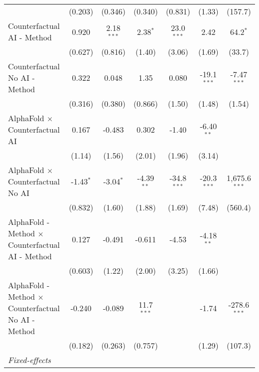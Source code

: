 \begin{tabular}{lcccccc}
                                                              & (0.203)      & (0.346)       & (0.340)      & (0.831)       & (1.33)        & (157.7)\\   
   Counterfactual AI - Method                                 & 0.920        & 2.18$^{***}$  & 2.38$^{*}$   & 23.0$^{***}$  & 2.42          & 64.2$^{*}$\\   
                                                              & (0.627)      & (0.816)       & (1.40)       & (3.06)        & (1.69)        & (33.7)\\   
   Counterfactual No AI - Method                              & 0.322        & 0.048         & 1.35         & 0.080         & -19.1$^{***}$ & -7.47$^{***}$\\   
                                                              & (0.316)      & (0.380)       & (0.866)      & (1.50)        & (1.48)        & (1.54)\\   
   AlphaFold $\times$ Counterfactual AI                       & 0.167        & -0.483        & 0.302        & -1.40         & -6.40$^{**}$  &   \\   
                                                              & (1.14)       & (1.56)        & (2.01)       & (1.96)        & (3.14)        &   \\   
   AlphaFold $\times$ Counterfactual No AI                    & -1.43$^{*}$  & -3.04$^{*}$   & -4.39$^{**}$ & -34.8$^{***}$ & -20.3$^{***}$ & 1,675.6$^{***}$\\   
                                                              & (0.832)      & (1.60)        & (1.88)       & (1.69)        & (7.48)        & (560.4)\\   
   AlphaFold - Method $\times$ Counterfactual AI - Method     & 0.127        & -0.491        & -0.611       & -4.53         & -4.18$^{**}$  &   \\   
                                                              & (0.603)      & (1.22)        & (2.00)       & (3.25)        & (1.66)        &   \\   
   AlphaFold - Method $\times$ Counterfactual No AI - Method  & -0.240       & -0.089        & 11.7$^{***}$ &               & -1.74         & -278.6$^{***}$\\   
                                                              & (0.182)      & (0.263)       & (0.757)      &               & (1.29)        & (107.3)\\   
   \midrule
   \emph{Fixed-effects}\\

\end{tabular}
